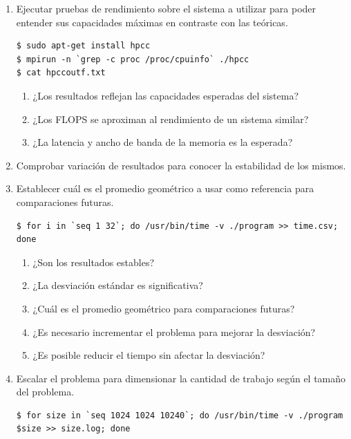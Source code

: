 \documentclass[a4paper]{report}
\begin{document}
\begin{enumerate}
\item Ejecutar pruebas de rendimiento sobre el sistema a utilizar para poder entender sus capacidades máximas en contraste con las teóricas.

\begin{lstlisting}[caption={Instalación de HPCC},label={lst:hpcc}]
$ sudo apt-get install hpcc
$ mpirun -n `grep -c proc /proc/cpuinfo` ./hpcc
$ cat hpccoutf.txt
\end{lstlisting}

\begin{enumerate}
\item ¿Los resultados reflejan las capacidades esperadas del sistema?
\item ¿Los FLOPS se aproximan al rendimiento de un sistema similar?
\item ¿La latencia y ancho de banda de la memoria es la esperada?
\end{enumerate}

\item Comprobar variación de resultados para conocer la estabilidad de los mismos. 
\item Establecer cuál es el promedio geométrico a usar como referencia para comparaciones futuras.

\begin{lstlisting}[caption={Estabilidad de Resultados},label={lst:time}]
$ for i in `seq 1 32`; do /usr/bin/time -v ./program >> time.csv; done
\end{lstlisting}

\begin{enumerate}
\item ¿Son los resultados estables?
\item ¿La desviación estándar es significativa?
\item ¿Cuál es el promedio geométrico para comparaciones futuras?
\item ¿Es necesario incrementar el problema para mejorar la desviación?
\item ¿Es posible reducir el tiempo sin afectar la desviación?
\end{enumerate}

\item Escalar el problema para dimensionar la cantidad de trabajo según el tamaño del problema.

\begin{lstlisting}[caption={Escalamiento de Problema},label={lst:size}]
$ for size in `seq 1024 1024 10240`; do /usr/bin/time -v ./program $size >> size.log; done
\end{lstlisting}


\end{enumerate}
\end{document}
